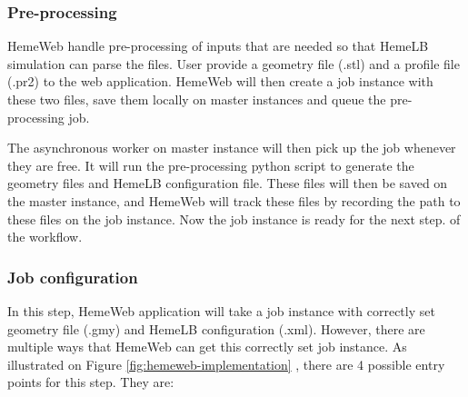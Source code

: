 \subsubsection{Pre-processing}

HemeWeb handle pre-processing of inputs that are needed so that HemeLB simulation can parse the files. User provide a geometry file (.stl) and a profile file (.pr2) to the web application. HemeWeb will then create a job instance with these two files, save them locally on master instances and queue the pre-processing job.

The asynchronous worker on master instance will then pick up the job whenever they are free. It will run the pre-processing python script to generate the geometry files and HemeLB configuration file. These files will then be saved on the master instance, and HemeWeb will track these files by recording the path to these files on the job instance. Now the job instance is ready for the next step. of the workflow.

\subsubsection{Job configuration}

In this step, HemeWeb application will take a job instance with correctly set geometry file (.gmy) and HemeLB configuration (.xml). However, there are multiple ways that HemeWeb can get this correctly set job instance. As illustrated on Figure \ref{fig:hemeweb-implementation} , there are 4 possible entry points for this step. They are:

